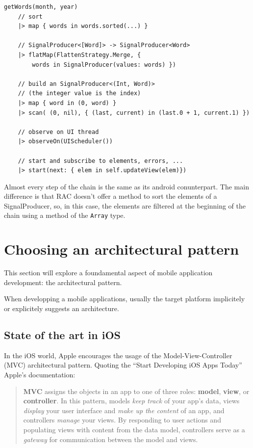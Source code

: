 \begin{verbatim}
getWords(month, year)
    // sort
    |> map { words in words.sorted(...) }

    // SignalProducer<[Word]> -> SignalProducer<Word>
    |> flatMap(FlattenStrategy.Merge, { 
    	words in SignalProducer(values: words) })

    // build an SignalProducer<(Int, Word)>
    // (the integer value is the index)
    |> map { word in (0, word) }
    |> scan( (0, nil), { (last, current) in (last.0 + 1, current.1) })

    // observe on UI thread
    |> observeOn(UIScheduler())

    // start and subscribe to elements, errors, ...
    |> start(next: { elem in self.updateView(elem)})
\end{verbatim}

Almost every step of the chain is the same as its android conunterpart.
The main difference is that RAC doesn't offer a method to sort the
elements of a SignalProducer, so, in this case, the elements are
filtered at the beginning of the chain using a method of the
\texttt{Array} type.


\section{Choosing an architectural
pattern}\label{choosing-an-architectural-pattern}

This section will explore a foundamental aspect of mobile application
development: the architectural pattern.

When developping a mobile applications, usually the target platform
implicitely or explicitely suggests an architecture.

\subsection{State of the art in iOS}\label{state-of-the-art-in-ios}

In the iOS world, Apple encourages the usage of the
Model-View-Controller (MVC) architectural pattern. Quoting the ``Start
Developing iOS Apps Today'' Apple's documentation:

\begin{quote}
\textbf{MVC} assigns the objects in an app to one of three roles:
\textbf{model}, \textbf{view}, or \textbf{controller}. In this pattern,
models \emph{keep track} of your app's data, views \emph{display} your
user interface and \emph{make up the content} of an app, and controllers
\emph{manage} your views. By responding to user actions and populating
views with content from the data model, controllers serve as a
\emph{gateway} for communication between the model and views.
\end{quote}

